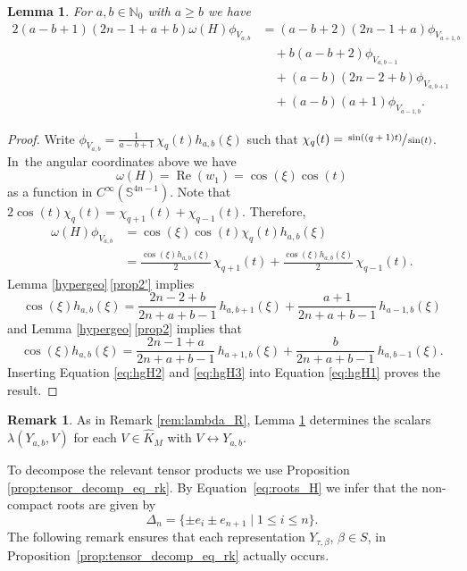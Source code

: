 \documentclass[JEP,XML,SOM,NoFloatCountersInSection,Unicode,published]{cedram}
\newtheorem{lemma}[theorem]{Lemma}
\theoremstyle{definition}
\newtheorem{remark}[theorem]{Remark}
\newcommand{\lra}{\ensuremath{\leftrightarrow}}
\newcommand{\mb}[1]{\ensuremath{\mathbb{#1}}}
\newcommand{\on}[1]{\ensuremath{\operatorname{#1}}}
\newcommand{\N}{\ensuremath{\mathbb{N}}}
\begin{document}
\begin{lemma}\label{la:decomp_omega_H}
For $a,b\in\N_0$ with $a\geq b$ we have
\begin{align*}
2(a-b+1)(2n-1+a+b)\omega(H)\phi_{V_{a,b}}&=(a-b+2)(2n-1+a)\phi_{V_{a+1,b}}\\
&\quad+b(a-b+2)\phi_{V_{a,b-1}}\\
&\quad+(a-b)(2n-2+b)\phi_{V_{a,b+1}}\\
&\quad+(a-b)(a+1)\phi_{V_{a-1,b}}.
\end{align*}
\end{lemma}

\begin{proof}
Write $\phi_{V_{a,b}}=\frac{1}{a-b+1}\,\chi_q(t)h_{a,b}(\xi)$ such that $\chi_q(t)=\sfrac{\sin((q+1)t)}{\sin(t)}$. In~the angular coordinates above we have
\[
\omega(H)=\on{Re}(w_1)=\cos(\xi)\cos(t)
\]
as a function in $C^\infty(\mb S^{4n-1})$. Note that $2\cos(t)\chi_{q}(t)=\chi_{q+1}(t)+\chi_{q-1}(t)$. Therefore,
\begin{equation}
\begin{aligned}
\omega(H)\phi_{V_{a,b}}&=\cos(\xi)\cos(t)\chi_q(t)h_{a,b}(\xi)\\
\label{eq:hgH1}&=\frac{\cos(\xi)h_{a,b}(\xi)}{2}\,\chi_{q+1}(t)+\frac{\cos(\xi)h_{a,b}(\xi)}{2}\,\chi_{q-1}(t).
\end{aligned}
\end{equation}
Lemma \ref{hypergeo}\,\eqref{prop2'} implies
\begin{equation}
\label{eq:hgH2}\cos(\xi)h_{a,b}(\xi)=\frac{2n-2+b}{2n+a+b-1}\,h_{a,b+1}(\xi)+\frac{a+1}{2n+a+b-1}\,h_{a-1,b}(\xi)
\end{equation}
and Lemma \ref{hypergeo}\,\eqref{prop2} implies that
\begin{equation}
\label{eq:hgH3}\cos(\xi)h_{a,b}(\xi)=\frac{2n-1+a}{2n+a+b-1}\,h_{a+1,b}(\xi)+\frac{b}{2n+a+b-1}\,h_{a,b-1}(\xi).
\end{equation}
Inserting Equation \eqref{eq:hgH2} and \eqref{eq:hgH3} into Equation \eqref{eq:hgH1} proves the result.
\end{proof}

\begin{remark}\label{rem:lambda_H}
As in Remark \ref{rem:lambda_R}, Lemma \ref{la:decomp_omega_H} determines the scalars $\lambda(Y_{a,b},V)$ for each $V\in\hat K_M$ with $V\lra Y_{a,b}$.
\end{remark}

To decompose the relevant tensor products we use Proposition \ref{prop:tensor_decomp_eq_rk}. By Equation~\eqref{eq:roots_H} we infer that the non-compact roots are given by
\[
\Delta_n=\{\pm e_i\pm e_{n+1}\mid1\leq i\leq n\}.
\]
The following remark ensures that each representation $Y_{\tau,\beta}$, $\beta\in S$, in Proposition~\ref{prop:tensor_decomp_eq_rk} actually occurs.
\end{document}
